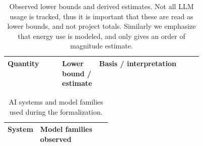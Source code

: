 \begin{table}[H]
\centering
\scriptsize
\caption{Observed lower bounds and derived estimates. Not all LLM usage is tracked, thus it is important that these are read as lower bounds, and not project totals. Similarly we emphasize that energy use is modeled, and only gives an order of magnitude estimate.}
\begin{tabularx}{\linewidth}{@{}p{0.28\linewidth}p{0.17\linewidth}>{\raggedright\arraybackslash}X@{}}
\toprule
Quantity & Lower bound / estimate & Basis / interpretation \\
\midrule

\end{tabularx}
\end{table}


\begin{table}[H]
\centering
\scriptsize
\caption{AI systems and model families used during the formalization.}
\label{tab:formalization-systems}
\begin{tabularx}{\linewidth}{@{}p{0.24\linewidth}>{\raggedright\arraybackslash}X@{}}
\toprule
System & Model families observed \\
\midrule

\end{tabularx}
\end{table}

\begin{table}[H]
\centering
\scriptsize
\caption{Recovered model-resolved token measurements.  These are measured lower bounds for the five labels with
recovered telemetry; models in \cref{tab:formalization-systems} that do not
appear here were still used.}
\label{tab:model-tokens-appendix}
\resizebox{\linewidth}{!}{}
\end{table}

